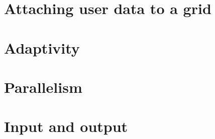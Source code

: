 \documentclass[11pt,a4paper,headinclude,footinclude,DIV14,BCOR8.25mm,titlepage,twoside,openright,normalheadings]{scrreprt}
\begin{document}
\chapter{Attaching user data to a grid}

\chapter{Adaptivity}

\chapter{Parallelism}

\chapter{Input and output}







\end{document}
